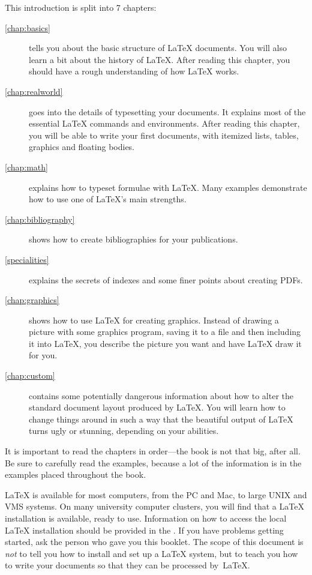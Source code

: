\bigskip
\noindent This introduction is split into 7 chapters:
\begin{description}
  \item[\autoref{chap:basics}] tells you about the basic structure of
    \LaTeX{} documents. You will also learn a bit about the history of
    \LaTeX{}. After reading this chapter, you should have a rough understanding
    of how \LaTeX{} works.
  \item[\autoref{chap:realworld}] goes into the details of typesetting your
    documents. It explains most of the essential \LaTeX{} commands and
    environments. After reading this chapter, you will be able to write your
    first documents, with itemized lists, tables, graphics and floating bodies.
  \item[\autoref{chap:math}] explains how to typeset formulae with \LaTeX.
    Many examples demonstrate how to use one of \LaTeX{}'s main strengths.
  \item[\autoref{chap:bibliography}] shows how to create bibliographies for
    your publications.
  \item[\autoref{specialities}] explains the secrets of indexes and some finer
    points about creating PDFs.
  \item[\autoref{chap:graphics}] shows how to use \LaTeX{} for creating
    graphics. Instead of drawing a picture with some graphics program, saving
    it to a file and then including it into \LaTeX{}, you describe the picture
    you want and have \LaTeX{} draw it for you.
  \item[\autoref{chap:custom}] contains some potentially dangerous
    information about how to alter the standard document layout produced by
    \LaTeX{}. You will learn how to change things around in such a way that the beautiful
    output of \LaTeX{} turns ugly or stunning, depending on your abilities.
\end{description}
\bigskip
\noindent It is important to read the chapters in order---the book is
not that big, after all. Be sure to carefully read the examples,
because a lot of the information is in the
examples placed throughout the book.

\bigskip
\noindent \LaTeX{} is available for most computers, from the PC and Mac, to
large UNIX and VMS systems. On many university computer clusters, you will
find that a \LaTeX{} installation is available, ready to use.
Information on how to access
the local \LaTeX{} installation should be provided in the \guide. If
you have problems getting started, ask the person who gave you this
booklet. The scope of this document is \emph{not} to tell you how to
install and set up a \LaTeX{} system, but to teach you how to write
your documents so that they can be processed by~\LaTeX{}.

